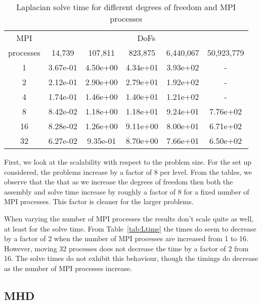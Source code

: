 \documentclass[10pt]{article}
\begin{document}
\begin{table}[h!]
    \centering
    \begin{tabular}{|c|ccccc|}
        \hline
        MPI & \multicolumn{5}{c|}{DoFs}\\
        processes &  14,739   &   107,811  &   823,875  &   6,440,067  & 50,923,779 \\
        \hline
        1  & 3.67e-01 &  4.50e+00 &  4.34e+01 &  3.93e+02 & - \\
        2  & 2.12e-01 &  2.90e+00 &  2.79e+01 &  1.92e+02 & - \\
        4  & 1.74e-01 &  1.46e+00 &  1.40e+01 &  1.21e+02 & - \\
        8  & 8.42e-02 &  1.18e+00 &  1.18e+01 &  9.24e+01 & 7.76e+02 \\
        16 & 8.28e-02 &  1.26e+00 &  9.11e+00 &  8.00e+01 & 6.71e+02 \\
        32 & 6.27e-02 &  9.35e-01 &  8.70e+00 &  7.66e+01 & 6.50e+02 \\
        \hline
    \end{tabular}
    \caption{Laplacian solve time for different degrees of freedom and MPI processes}
    \label{tab:Lsolve}
\end{table}
First, we look at the scalability with respect to the problem size. For the set up considered, the problems increase by a factor of 8 per level. From the tables, we observe that the that as we increase the degrees of freedom then both the assembly and solve time increase by roughly a factor of 8 for a fixed number of MPI processes. This factor is cleaner for the larger problems.

When varying the number of MPI processes the results don't scale quite as well, at least for the solve time. From Table~\ref{tab:Ltime} the times do seem to decrease by a factor of 2 when the number of MPI processes are increased from 1 to 16. However, moving 32 processes does not decrease the time by a factor of 2 from 16. The solve times do not exhibit this behaviour, though the timings do decrease as the number of MPI processes increase.

\subsection{MHD} \label{sec:MHD}
\end{document}
